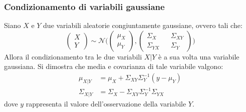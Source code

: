 \subsubsection{Condizionamento di variabili gaussiane}
Siano $X$ e $Y$ due variabili aleatorie congiuntamente gaussiane, ovvero tali che:
\begin{equation}
\label{congiuntgauss}
\begin{pmatrix}X \\ Y\end{pmatrix} \sim \mathcal{N} \Biggl ( \begin{pmatrix}\mu_X \\ \mu_Y\end{pmatrix}, \begin{pmatrix}\Sigma_X && \Sigma_{XY} \\ \Sigma_{YX} && \Sigma_Y\end{pmatrix} \Biggl )
\end{equation}
Allora il condizionamento tra le due variabili $X|Y$ è a sua volta una variabile gaussiana.
Si dimostra\cite{stimablue} che media e covarianza di tale variabile valgono:
\begin{align}
\mu_{X|Y}&=\mu_X + \Sigma_{XY}\Sigma_{Y}^{-1}(y-\mu_Y)\\
\Sigma_{X|Y}&=\Sigma_X-\Sigma_{XY}\Sigma_{Y}^{-1}\Sigma_{YX}
\end{align}
dove $y$ rappresenta il valore dell'osservazione della variabile $Y$.

\newpage